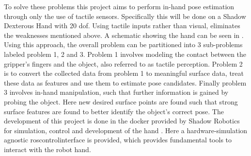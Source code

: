 \begin{minipage}{0.45\textwidth}
	To solve these problems this project aims to perform in-hand pose estimation through only the use of tactile sensors. Specifically this will be done on a Shadow Dexterous Hand \cite{shadow-dex-hand} with 20 \gls{dof}. Using tactile inputs rather than visual, eliminates the weaknesses mentioned above. A schematic showing the hand can be seen in . Using this approach, the overall problem can be partitioned into 3 sub-problems labeled problem 1, 2 and 3. Problem 1 involves modeling the contact between the gripper's fingers and the object, also referred to as tactile perception. Problem 2 is to convert the collected data from problem 1 to meaningful surface data, treat these data as features and use them to estimate pose candidates. Finally problem 3 involves in-hand manipulation, such that further information is gained by probing the object. Here new desired surface points are found such that strong surface features are found to better identify the object's correct pose. 
	The development of this project is done in the \gls{docker} provided by Shadow Robotics for simulation, control and development of the hand \cite{shadow-dex-github}. Here a hardware-simulation agnostic \gls{ros}\fakecite control\fakecite interface is provided, which provides fundamental tools to interact with the robot hand. \medskip
	\end{minipage} 
	\hfill
